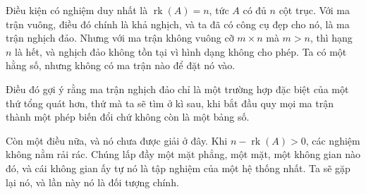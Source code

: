 \documentclass[12pt,a4paper]{article}
\begin{document}
Điều kiện có nghiệm duy nhất là \(\operatorname{rk}(A)=n\), tức \(A\) có đủ \(n\) cột trục. Với ma trận vuông, điều đó chính là khả nghịch, và ta đã có công cụ đẹp cho nó, là ma trận nghịch đảo. Nhưng với ma trận không vuông cỡ \(m\times n\) mà \(m>n\), thì hạng \(n\) là hết, và nghịch đảo không tồn tại vì hình dạng không cho phép. Ta có một hằng số, nhưng không có ma trận nào để đặt nó vào.

Điều đó gợi ý rằng ma trận nghịch đảo chỉ là một trường hợp đặc biệt của một thứ tổng quát hơn, thứ mà ta sẽ tìm ở kì sau, khi bắt đầu quy mọi ma trận thành một phép biến đổi chứ không còn là một bảng số.

Còn một điều nữa, và nó chưa được giải ở đây. Khi \(n-\operatorname{rk}(A)>0\), các nghiệm không nằm rải rác. Chúng lấp đầy một mặt phẳng, một mặt, một không gian nào đó, và cái không gian ấy tự nó là tập nghiệm của một hệ thống nhất. Ta sẽ gặp lại nó, và lần này nó là đối tượng chính.
\end{document}
